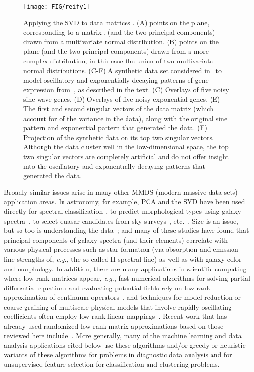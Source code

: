 \documentclass[twoside]{article}
\begin{document}
\begin{figure}
\begin{center}
\texttt{[image: FIG/reify1]}
\caption{Applying the SVD to data matrices .
(A)  points on the plane, corresponding to a  matrix , 
(and the two principal components) drawn from a multivariate normal 
distribution.
(B)  points on the plane (and the two principal components) drawn from a 
more complex distribution, in this case the union of two multivariate normal 
distributions.
(C-F) A synthetic data set considered in~\cite{WRR03} to model 
oscillatory and exponentially decaying patterns of gene expression 
from~\cite{Cho_cellcycle_98}, as described in the text.
(C) Overlays of five noisy sine wave genes.
(D) Overlays of five noisy exponential genes.
(E) The first and second singular vectors of the data matrix (which account for 
 of the variance in the data), along with the original sine pattern and 
exponential pattern that generated the data.
(F) Projection of the synthetic data on its top two singular vectors.
Although the data cluster well in the low-dimensional space, the top two 
singular vectors are completely artificial and do not offer insight into the 
oscillatory and exponentially decaying patterns that generated the data.}
\label{fig:hardcorepicture}
\end{center}
\end{figure}

Broadly similar issues arise in many other MMDS (modern massive data sets) application areas.  
In astronomy, for example, PCA and the SVD have been used directly for 
spectral classification~\cite{CSBKC95,CS99,MLTT01,YCSetc04}, 
to predict morphological types using galaxy spectra~\cite{FLM96}, 
to select quasar candidates from sky surveys~\cite{YCVetc04}, 
etc.~\cite{BLFetc04,BWSDY09,MKI10,BL10}.
Size is an issue, but so too is understanding the data~\cite{BDPS02,BB10}; 
and many of these studies have found that principal components of galaxy 
spectra (and their elements) correlate with various physical processes such 
as star formation (via absorption and emission line strengths of, 
\emph{e.g.}, the so-called H spectral line) as well as with galaxy color and morphology.
In addition, there are many applications in scientific computing where 
low-rank matrices appear, \emph{e.g.}, fast numerical algorithms for solving
partial differential equations and evaluating potential fields rely on 
low-rank approximation of continuum operators~\cite{GR97,GH03}, and 
techniques for model reduction or coarse graining of multiscale physical 
models that involve rapidly oscillating coefficients often employ low-rank 
linear mappings~\cite{Engquist01}.
Recent work that has already used randomized low-rank matrix approximations
based on those reviewed here 
include~\cite{CDY07_JRNL,EY07,Mar08_TR,LLY11,LYMLYE11,CB10_DRAFT}.
More generally, many of the machine learning and data analysis applications 
cited below use these algorithms and/or greedy or heuristic variants of 
these algorithms for problems in diagnostic data analysis and for 
unsupervised feature selection for classification and clustering problems.
\end{document}
